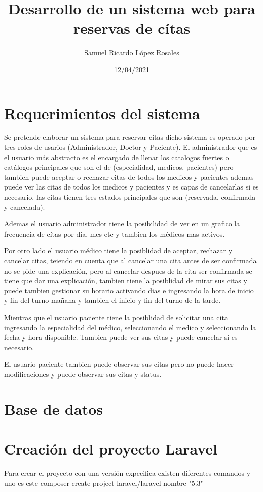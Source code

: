 \documentclass[a4paper]{article}
\title{Desarrollo de un sistema web para reservas de cítas}
\author{Samuel Ricardo López Rosales}
\date{12/04/2021}
\begin{document}
	\maketitle
	\newpage
	
	\section{Requerimientos del sistema}
	\hfill \break
	
	Se pretende elaborar un sistema para reservar citas dicho sistema es operado por tres roles de usarios (Administrador, Doctor y Paciente). El administrador que es el usuario más abstracto es el encargado de llenar los catalogos fuertes o catálogos principales que son el de (especialidad, medicos, pacientes) pero tambien puede aceptar o rechazar citas de todos los medicos y pacientes ademas puede ver las citas de todos los medicos y pacientes y es capas de cancelarlas si es necesario, las citas tienen tres estados principales que son (reservada, confirmada y cancelada).
	
	Ademas el usuario administrador tiene la posibilidad de ver en un grafico la frecuencia de cítas por dia, mes etc y tambien los médicos mas activos.
	
	
	Por otro lado el usuario médico tiene la posiblidad de aceptar, rechazar y cancelar citas, teiendo en cuenta que al cancelar una cita antes de ser confirmada no se pide una explicación, pero al cancelar despues de la cita ser confirmada se tiene que dar una explicación, tambien tiene la posiblidad de mirar sus citas y puede tambien gestionar su horario activando dias e ingresando la hora de inicio y fin del turno mañana y tambien el inicio y fin del turno de la tarde.
	
	Mientras que el usuario paciente tiene la posiblidad de solicitar una cita ingresando la especialidad del médico, seleccionando el medico y seleccionando la fecha y hora disponible. Tambien puede ver sus citas y puede cancelar si es necesario.
	
	El usuario paciente tambien puede observar sus citas pero no puede hacer modificaciones y puede observar sus citas y status. 
	
	
	\section{Base de datos}
	\hfill \break
	
	\section{Creación del proyecto Laravel}
	\hfill \break
	Para crear el proyecto con una versión expecifica existen diferentes comandos y uno es este composer create-project laravel/laravel nombre "5.3"
	
\end{document}
